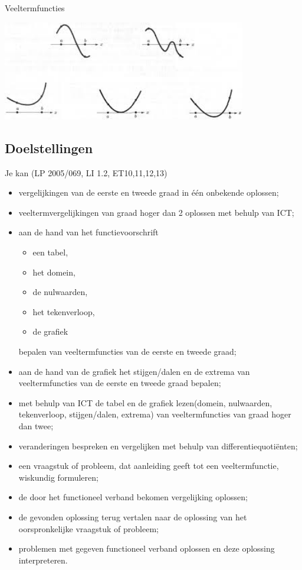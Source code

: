 \documentclass[12pt]{article}
\begin{document}
\thispagestyle{empty}
\begin{center}
  \begin{mdframed}
    \centering
    \fontsize{35}{70}\selectfont Veeltermfuncties
  \end{mdframed}
  \vfill
  \includegraphics[width=0.8\textwidth]{veeltermen}
  \vfill
\end{center}
\vspace*{-2cm}

\subsection*{Doelstellingen}
{\singlespacing
  Je kan \hfill  {\scriptsize(LP 2005/069, LI 1.2, ET10,11,12,13)}
  \begin{itemize}
  \item vergelijkingen van de eerste en tweede graad in één onbekende oplossen;
  \item veeltermvergelijkingen van graad hoger dan 2 oplossen met behulp van ICT;
  \item aan de hand van het functievoorschrift
    \begin{itemize}
    \item een tabel,
    \item het domein,
    \item de nulwaarden,
    \item het tekenverloop,
    \item de grafiek
    \end{itemize}
    bepalen van veeltermfuncties van de eerste en tweede graad;
  \item aan de hand van de grafiek het stijgen/dalen en de extrema van veeltermfuncties van de eerste en tweede graad bepalen;
  \item met behulp van ICT de tabel en de grafiek lezen(domein, nulwaarden, tekenverloop, stijgen/dalen, extrema) van veeltermfuncties van graad hoger dan twee;
  \item veranderingen bespreken en vergelijken met behulp van differentiequotiënten;
  \item een vraagstuk of probleem, dat aanleiding geeft tot een veeltermfunctie, wiskundig formuleren;
  \item de door het functioneel verband bekomen vergelijking oplossen;
  \item de gevonden oplossing terug vertalen naar de oplossing van het oorspronkelijke vraagstuk of probleem;
  \item problemen met gegeven functioneel verband oplossen en deze oplossing interpreteren.
  \end{itemize}

}
\thispagestyle{empty}
\mbox{}
\newpage
\clearpage
\thispagestyle{empty}
\tableofcontents
\newpage
\clearpage
{}
\end{document}
